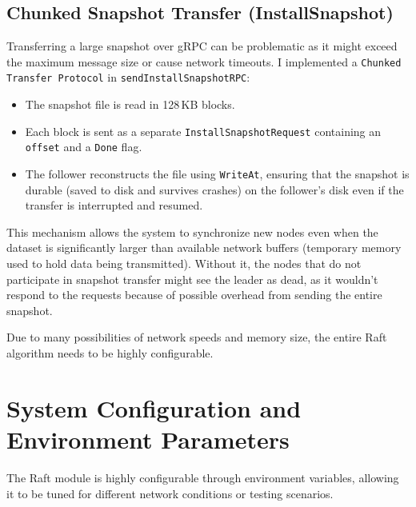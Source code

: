 \documentclass[shortabstract]{iithesis}
\begin{document}
\subsection{Chunked Snapshot Transfer (InstallSnapshot)}
Transferring a large snapshot over gRPC can be problematic as it might exceed the maximum message size or cause network timeouts. I implemented a \texttt{Chunked Transfer Protocol} in \texttt{sendInstallSnapshotRPC}:
\begin{itemize}
    \item The snapshot file is read in 128\,KB blocks.
    \item Each block is sent as a separate \texttt{InstallSnapshotRequest} containing an \texttt{offset} and a \texttt{Done} flag.
    \item The follower reconstructs the file using \texttt{WriteAt}, ensuring that the snapshot is durable (saved to disk and survives crashes) on the follower's disk even if the transfer is interrupted and resumed.
\end{itemize}
This mechanism allows the system to synchronize new nodes even when the dataset is significantly larger than available network buffers (temporary memory used to hold data being transmitted). Without it, the nodes that do not participate in snapshot transfer might see the leader as dead, as it wouldn't respond to the requests because of possible overhead from sending the entire snapshot. 

Due to many possibilities of network speeds and memory size, the entire Raft algorithm needs to be highly configurable.

\section{System Configuration and Environment Parameters}
The Raft module is highly configurable through environment variables, allowing it to be tuned for different network conditions or testing scenarios.
\end{document}
